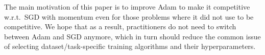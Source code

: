 \documentclass[usenames,dvipsnames]{article} %
\newcommand{\franknips}[1]{\textcolor{black}{#1}}
\begin{document}

The main motivation of this paper is to improve Adam 
to make it competitive w.r.t.\ SGD with momentum even for those problems where it did not use to be competitive. 
We hope that as a result, practitioners do not need to switch between Adam and SGD anymore, which in turn should reduce the common issue of selecting dataset/task-specific training algorithms and their hyperparameters. 




\newcommand{\adamcolor}{Thistle}
\newcommand{\ouradamcolor}{SpringGreen}
\newcommand{\adam}[1]{\colorbox{\adamcolor}{$\displaystyle #1$}}
\newcommand{\adamtext}[1]{\colorbox{\adamcolor}{#1}}
\newcommand{\ouradam}[1]{\colorbox{\ouradamcolor}{$\displaystyle #1$}}
\newcommand{\ouradamtext}[1]{\colorbox{\ouradamcolor}{#1}}
\end{document}
